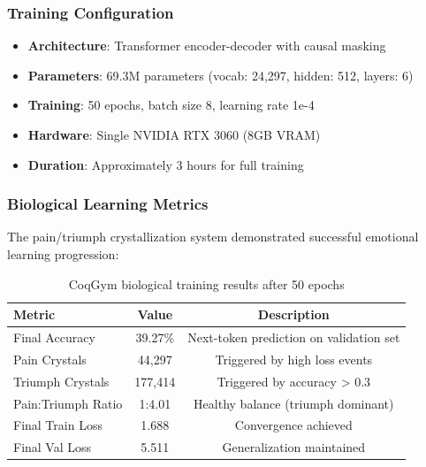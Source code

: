 \documentclass[12pt]{article}
\begin{document}
\subsubsection{Training Configuration}

\begin{itemize}
\item \textbf{Architecture}: Transformer encoder-decoder with causal masking
\item \textbf{Parameters}: 69.3M parameters (vocab: 24,297, hidden: 512, layers: 6)
\item \textbf{Training}: 50 epochs, batch size 8, learning rate 1e-4
\item \textbf{Hardware}: Single NVIDIA RTX 3060 (8GB VRAM)
\item \textbf{Duration}: Approximately 3 hours for full training
\end{itemize}

\subsubsection{Biological Learning Metrics}

The pain/triumph crystallization system demonstrated successful emotional learning progression:

\begin{table}[h]
\centering
\begin{tabular}{lcc}
\toprule
\textbf{Metric} & \textbf{Value} & \textbf{Description} \\
\midrule
Final Accuracy & 39.27\% & Next-token prediction on validation set \\
Pain Crystals & 44,297 & Triggered by high loss events \\
Triumph Crystals & 177,414 & Triggered by accuracy > 0.3 \\
Pain:Triumph Ratio & 1:4.01 & Healthy balance (triumph dominant) \\
Final Train Loss & 1.688 & Convergence achieved \\
Final Val Loss & 5.511 & Generalization maintained \\
\bottomrule
\end{tabular}
\caption{CoqGym biological training results after 50 epochs}
\end{table}
\end{document}

